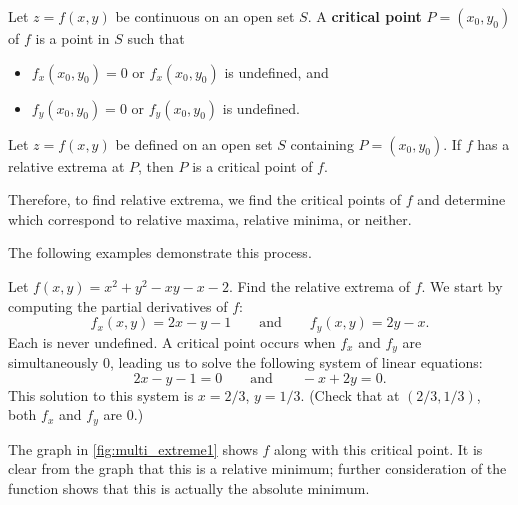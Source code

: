 \begin{definition}\label{def:multi_critical_point}
Let $z = f(x,y)$ be continuous on an open set $S$. A \textbf{critical point} $P=(x_0,y_0)$ of $f$ is a point in $S$ such that
\begin{itemize}
	\item $f_x(x_0,y_0) = 0$ or $f_x(x_0,y_0)$ is undefined, and
	\item $f_y(x_0,y_0) = 0$ or $f_y(x_0,y_0)$ is undefined.
\end{itemize}
\end{definition}

\begin{theorem}\label{thm:multi_critical_point}
Let $z=f(x,y)$ be defined on an open set $S$ containing $P=(x_0,y_0)$. If $f$ has a relative extrema at $P$, then $P$ is a critical point of $f$.
\end{theorem}

Therefore, to find relative extrema, we find the critical points of $f$ and determine which correspond to relative maxima, relative minima, or neither.


The following examples demonstrate this process.

\begin{example}\label{ex_multi_extreme1}
Let $f(x,y) = x^2+y^2-xy-x-2$. Find the relative extrema of $f$.
\solution
We start by computing the partial derivatives of $f$:
%
%
\[f_x(x,y) = 2x-y-1 \qquad \text{and}\qquad f_y(x,y) = 2y-x.\]
Each is never undefined. A critical point occurs when $f_x$ and $f_y$ are simultaneously 0, leading us to solve the following system of linear equations:
\[2x-y-1 = 0\qquad \text{and}\qquad -x+2y = 0.\]
This solution to this system is $x=2/3$, $y=1/3$. (Check that at $(2/3,1/3)$, both $f_x$ and $f_y$ are 0.)

The graph in \autoref{fig:multi_extreme1} shows $f$ along with this critical point. It is clear from the graph that this is a relative minimum; further consideration of the function shows that this is actually the absolute minimum.
\end{example}

